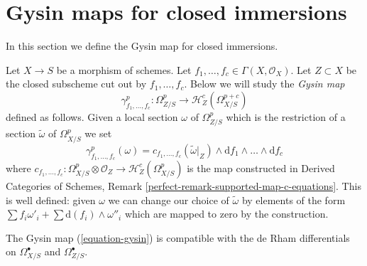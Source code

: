 \section{Gysin maps for closed immersions}
\label{section-gysin}

\noindent
In this section we define the Gysin map for closed immersions.

\begin{remark}
\label{remark-gysin-equations}
Let $X \to S$ be a morphism of schemes. Let
$f_1, \ldots, f_c \in \Gamma(X, \mathcal{O}_X)$. Let $Z \subset X$
be the closed subscheme cut out by $f_1, \ldots, f_c$. Below we will
study the {\it Gysin map}
\begin{equation}
\label{equation-gysin}
\gamma^p_{f_1, \ldots, f_c} :
\Omega^p_{Z/S}
\longrightarrow
\mathcal{H}_Z^c(\Omega^{p + c}_{X/S})
\end{equation}
defined as follows. Given a local section $\omega$ of $\Omega^p_{Z/S}$
which is the restriction of a section $\tilde \omega$ of $\Omega^p_{X/S}$
we set
$$
\gamma^p_{f_1, \ldots, f_c}(\omega) =
c_{f_1, \ldots, f_c}(\tilde \omega|_Z) \wedge
\text{d}f_1 \wedge \ldots \wedge \text{d}f_c
$$
where $c_{f_1, \ldots, f_c} : \Omega^p_{X/S} \otimes \mathcal{O}_Z \to
\mathcal{H}_Z^c(\Omega^p_{X/S})$ is the map constructed in
Derived Categories of Schemes, Remark
\ref{perfect-remark-supported-map-c-equations}.
This is well defined: given $\omega$ we can change our choice of
$\tilde \omega$ by elements of the form
$\sum f_i \omega'_i + \sum \text{d}(f_i) \wedge \omega''_i$
which are mapped to zero by the construction.
\end{remark}

\begin{lemma}
\label{lemma-gysin-differential}
The Gysin map (\ref{equation-gysin}) is compatible with the de Rham
differentials on $\Omega^\bullet_{X/S}$ and $\Omega^\bullet_{Z/S}$.
\end{lemma}

